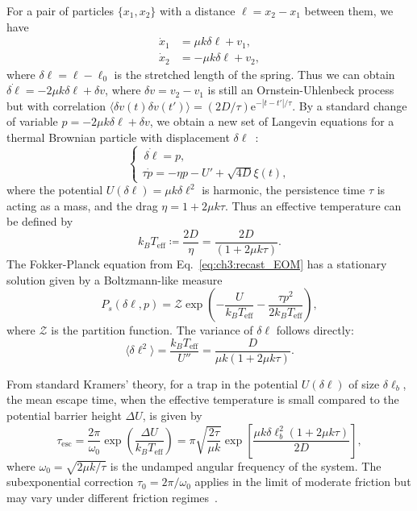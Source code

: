 For a pair of particles $\{x_1, x_2\}$ with a distance $\ell=x_2-x_1$ between them, we have
\begin{align*}
    \dot{x}_1 &= \mu k\delta\ell + v_1,\\
    \dot{x}_2 &= -\mu k\delta\ell + v_2,
\end{align*}
where $\delta\ell=\ell-\ell_0$ is the stretched length of the spring. Thus we can obtain $\dot{\delta\ell}=-2\mu k\delta\ell + \delta v$, where $\delta v = v_2 -v_1$ is still an Ornstein-Uhlenbeck process but with correlation $\langle\delta v(t)\delta v(t')\rangle = (2D/\tau)\mathrm{e}^{-|t-t'|/\tau}$. By a standard change of variable $p=-2\mu k\delta\ell +\delta v$, we obtain a new set of Langevin equations for a thermal Brownian particle with displacement $\delta \ell$~\cite{woillez2020active,woillez2020nonlocal}:
\begin{equation}\label{eq:ch3:recast_EOM}
\begin{cases}
    \,\dot{\delta\ell}=p,\\
    \tau\dot{p}=-\eta p -U' + \sqrt{4D}\xi(t),
\end{cases}
\end{equation}
where the potential $U(\delta\ell)=\mu k\delta\ell^2$ is harmonic, the persistence time $\tau$ is acting as a mass, and the drag $\eta =1+2\mu k\tau$. Thus an effective temperature can be defined by
\begin{equation}
    k_BT_\textrm{eff} \coloneq \frac{2D}{\eta} = \frac{2D}{(1+2\mu k\tau)}.
\end{equation}
The Fokker-Planck equation from Eq.~\eqref{eq:ch3:recast_EOM} has a stationary solution given by a Boltzmann-like measure
\begin{equation}
    P_s(\delta\ell, p)=\mathcal{Z}\exp\left(-\frac{U}{k_B T_\textrm{eff}} -\frac{\tau p^2}{2k_B T_\textrm{eff}}\right),
\end{equation}
where $\mathcal{Z}$ is the partition function. The variance of $\delta\ell$ follows directly:
\begin{equation}
\langle\delta\ell^2\rangle =\frac{k_B T_\textrm{eff}}{U''} = \frac{D}{\mu k(1+2\mu k\tau)}.
\end{equation}

From standard Kramers' theory, for a trap in the potential $U(\delta\ell)$ of size $\delta\ell_b$, the mean escape time, when the effective temperature is small compared to the potential barrier height $\Delta U$, is given by~\cite{gardiner2009stochastic,hanggi1990reaction,haunggi1994colored}
\begin{equation}
    \tau_\textrm{esc}=\frac{2\pi}{\omega_0}\exp\left(\frac{\Delta U}{k_BT_\textrm{eff}}\right)=\pi\sqrt{\frac{2\tau}{\mu k}}\exp\left[\frac{\mu k\delta\ell_b^2(1+2\mu k\tau)}{2D}\right],
\end{equation}
where $\omega_0 = \sqrt{2\mu k/\tau}$ is the undamped angular frequency of the system. The subexponential correction $\tau_0=2\pi/\omega_0$ applies in the limit of moderate friction but may vary under different friction regimes~\cite{wexler2020dynamics,hanggi1990reaction}.


